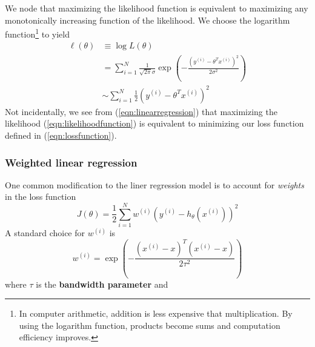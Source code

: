\documentclass{article}
\theoremstyle{definition}
\theoremstyle{remark}
\begin{document}
We node that maximizing the likelihood function is equivalent to maximizing any monotonically increasing function of the likelihood.
We choose the logarithm function\footnote{In computer arithmetic, addition is less expensive that multiplication. 
By using the logarithm function, products become sums and computation efficiency improves.} to yield
\begin{align}
    \ell(\theta) &\equiv \log L(\theta) \nonumber \\
    &= \sum_{i=1}^{N} \frac{1}{\sqrt{2\pi}\sigma}\exp\left(-\frac{{(y^{(i)} - \theta^{T}x^{(i)})}^{2}}{2\sigma^{2}}\right) \nonumber \\
    &\sim \sum_{i=1}^{N}\frac{1}{2}{\left(y^{(i)} - \theta^{T}x^{(i)}\right)}^{2} \label{eqn:likelihoodfunction}
  \end{align}
Not incidentally, we see from (\ref{eqn:linearregression}) that maximizing the likelihood  (\ref{eqn:likelihoodfunction}) is equivalent to minimizing our loss function defined in (\ref{eqn:lossfunction}).

\subsubsection{Weighted linear regression}
One common modification to the liner regression model is to account for \textit{weights} in the loss function
\begin{equation}
  J(\theta) = \frac{1}{2}\sum_{i=1}^{N}w^{(i)}{\left(y^{(i)} - h_{\theta}(x^{(i)})\right)}^{2}
\end{equation}
A standard choice for $w^{(i)}$ is
\begin{equation}
  w^{(i)} = \exp\left(-\frac{{(x^{(i)} - x)}^{T}(x^{(i)}-x)}{2\tau^{2}}\right)
\end{equation}
where $\tau$ is the \textbf{bandwidth parameter} and  
\end{document}
